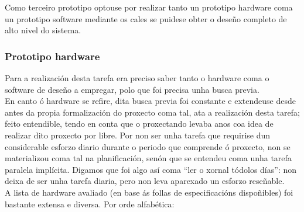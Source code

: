  Como terceiro prototipo optouse por realizar tanto un prototipo hardware coma
 un prototipo software mediante os cales se puidese obter o deseño completo de
 alto nivel do sistema.

  \subsubsection{Prototipo hardware}

  Para a realización desta tarefa era preciso saber tanto o hardware coma o
  software de deseño a empregar, polo que foi precisa unha busca previa. \\

  En canto ó hardware se refire, dita busca previa foi constante e extendeuse
  desde antes da propia formalización do proxecto coma tal, ata a realización
  desta tarefa; feito entendible, tendo en conta que o proxectando levaba anos
  coa idea de realizar dito proxecto por libre. Por non ser unha tarefa que
  requirise dun considerable esforzo diario durante o periodo que comprende ó
  proxecto, non se materializou coma tal na planificación, senón que se
  entendeu coma unha tarefa paralela implícita. Digamos que foi algo así coma
  ``ler o xornal tódolos días'': non deixa de ser unha tarefa diaria, pero non
  leva aparexado un esforzo reseñable. \\

  A lista de hardware avaliado (en base ás follas de especificacións
  dispoñibles) foi bastante extensa e diversa. Por orde alfabética:

